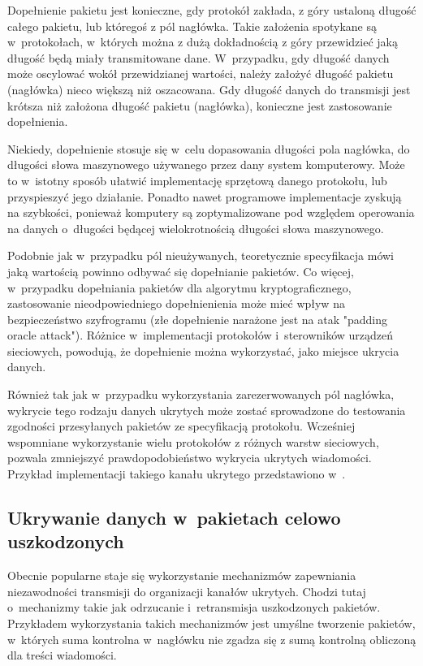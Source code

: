 \documentclass[a4paper, twoside, 12pt]{report}
\begin{document}
        Dopełnienie pakietu jest konieczne, gdy protokół zakłada, z góry ustaloną długość
        całego pakietu, lub któregoś z pól nagłówka. Takie założenia spotykane są
        w~protokołach, w~których można z dużą dokładnością z góry przewidzieć jaką długość
        będą miały transmitowane dane. W~przypadku, gdy długość danych może oscylować
        wokół przewidzianej wartości, należy założyć długość pakietu (nagłówka)
        nieco większą niż oszacowana. Gdy długość danych do transmisji jest krótsza niż
        założona długość pakietu (nagłówka), konieczne jest zastosowanie dopełnienia.

        Niekiedy, dopełnienie stosuje się w~celu dopasowania długości pola nagłówka,
        do długości słowa maszynowego używanego przez dany system komputerowy. Może
        to w~istotny sposób ułatwić implementację sprzętową danego protokołu, lub
        przyspieszyć jego działanie. Ponadto nawet programowe implementacje zyskują
        na szybkości, ponieważ komputery są zoptymalizowane pod względem operowania
        na danych o~długości będącej wielokrotnością długości słowa maszynowego.

        Podobnie jak w~przypadku pól nieużywanych, teoretycznie specyfikacja
        mówi jaką wartością powinno odbywać się dopełnianie pakietów. Co więcej,
        w~przypadku dopełniania pakietów dla algorytmu kryptograficznego, zastosowanie
        nieodpowiedniego dopełnienienia może mieć wpływ na bezpieczeństwo szyfrogramu (złe dopełnienie narażone
        jest na atak "padding oracle attack"). Różnice w~implementacji protokołów
        i~sterowników urządzeń sieciowych, powodują, że dopełnienie można wykorzystać,
        jako miejsce ukrycia danych\cite{PADSTEG}.

        Również tak jak w~przypadku wykorzystania zarezerwowanych pól nagłówka,
        wykrycie tego rodzaju danych ukrytych może zostać sprowadzone do testowania
        zgodności przesyłanych pakietów ze specyfikacją protokołu. Wcześniej wspomniane
        wykorzystanie wielu protokołów z różnych warstw sieciowych, pozwala zmniejszyć
        prawdopodobieństwo wykrycia ukrytych wiadomości. Przykład implementacji
        takiego kanału ukrytego przedstawiono w~\cite{PADSTEG}.

        \subsection{Ukrywanie danych w~pakietach celowo uszkodzonych} \label{USZKODZONEPAKIETY}
        Obecnie popularne staje się wykorzystanie mechanizmów zapewniania niezawodności
        transmisji do organizacji kanałów ukrytych. Chodzi tutaj o~mechanizmy
        takie jak odrzucanie i~retransmisja uszkodzonych pakietów. Przykładem wykorzystania takich
        mechanizmów jest umyślne tworzenie pakietów, w~których suma kontrolna w~nagłówku
        nie zgadza się z sumą kontrolną obliczoną dla treści wiadomości.
\end{document}
